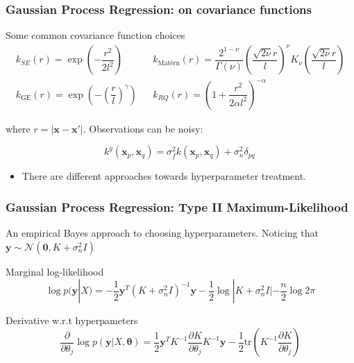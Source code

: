 \documentclass[10pt,usenames,dvipsnames]{beamer}
\begin{document}
		\begin{frame}
			\frametitle{Gaussian Process Regression: on covariance functions}

			\begin{block}{Some common covariance function choices}
				\begin{equation}
				\begin{matrix}
				k_{SE}(r) = \exp\left(-\dfrac{r^2}{2l^2} \right) && 				k_{\textrm{Matèrn}}(r) = \dfrac{2^{1-\nu}}{\Gamma(\nu)}\left(\dfrac{\sqrt{2\nu} r}{l}    \right)^\nu K_\nu\left( \dfrac{
					\sqrt{2\nu}r}{l} \right) \\
				k_{\mathrm{GE}}(r) = \exp\left( - \left(\dfrac{r}{l}\right)^\gamma  \right) && k_{RQ}(r) = \left( 1 + \dfrac{r^2}{2\alpha l^2} \right)^{-\alpha}
				\end{matrix}
				\end{equation}
				
				where $r=|\boldsymbol{x} - \boldsymbol{x'}|$. Observations can be \textcolor{Periwinkle}{noisy}:
				
				\begin{equation}
					k^y(\boldsymbol{x}_p, \boldsymbol{x}_q) = \sigma^2_f k(\boldsymbol{x}_p, \boldsymbol{x}_q) + \sigma^2_n \delta_{pq} \,
				\end{equation} 
				
			\end{block}
			\begin{itemize}
				\item There are different approaches towards hyperparameter treatment.
			\end{itemize}
		\end{frame}
		
		\begin{frame}
			\frametitle{Gaussian Process Regression: Type II Maximum-Likelihood}
			An empirical Bayes approach to choosing hyperparameters. Noticing that $\boldsymbol{y} \sim \mathcal{N}(\boldsymbol{0}, K + 
			\sigma_n^2 I)$
			\begin{block}{Marginal log-likelihood}
				\begin{equation}
				\log p(\boldsymbol{y}|X) = - \dfrac{1}{2}\boldsymbol{y}^T(K + \sigma^2_n I)^{-1}\boldsymbol{y} - \dfrac{1}{2}\log |K + \sigma^2_n I| - \dfrac{n}{2}\log 2\pi
				\end{equation}
			\end{block}
			
			\begin{block}{Derivative w.r.t hyperpameters}
				\begin{equation}
				\dfrac{\partial}{\partial \theta_j}\log p(\boldsymbol{y}|X, \boldsymbol{\theta}) = \dfrac{1}{2}\boldsymbol{y}^T K^{-1}\dfrac{\partial K}{\partial \theta_j}K^{-1}\boldsymbol{y} - \dfrac{1}{2}\textrm{tr}\left(K^{-1} \dfrac{\partial K}{\partial \theta_j} \right)
				\end{equation}
			\end{block}
		\end{frame}
			
\end{document}
